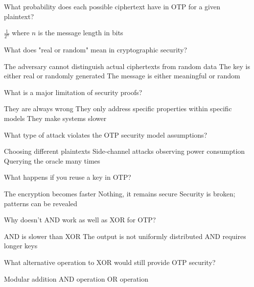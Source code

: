\documentclass[10pt,a4paper,american]{exam}
\begin{document}
\begin{questions}
	\question What probability does each possible ciphertext have in OTP for a given plaintext?
	\begin{randomizechoices}
		\CorrectChoice $\frac{1}{2^n}$ where $n$ is the message length in bits
	\end{randomizechoices}

	\question What does "real or random" mean in cryptographic security?
	\begin{randomizechoices}
		\CorrectChoice The adversary cannot distinguish actual ciphertexts from random data
		\choice The key is either real or randomly generated
		\choice The message is either meaningful or random
	\end{randomizechoices}

	\question What is a major limitation of security proofs?
	\begin{randomizechoices}
		\choice They are always wrong
		\CorrectChoice They only address specific properties within specific models
		\choice They make systems slower
	\end{randomizechoices}

	\question What type of attack violates the OTP security model assumptions?
	\begin{randomizechoices}
		\choice Choosing different plaintexts
		\CorrectChoice Side-channel attacks observing power consumption
		\choice Querying the oracle many times
	\end{randomizechoices}

	\question What happens if you reuse a key in OTP?
	\begin{randomizechoices}
		\choice The encryption becomes faster
		\choice Nothing, it remains secure
		\CorrectChoice Security is broken; patterns can be revealed
	\end{randomizechoices}

	\question Why doesn't AND work as well as XOR for OTP?
	\begin{randomizechoices}
		\choice AND is slower than XOR
		\CorrectChoice The output is not uniformly distributed
		\choice AND requires longer keys
	\end{randomizechoices}

	\question What alternative operation to XOR would still provide OTP security?
	\begin{randomizechoices}
		\CorrectChoice Modular addition
		\choice AND operation
		\choice OR operation
	\end{randomizechoices}


\end{questions}
\end{document}
